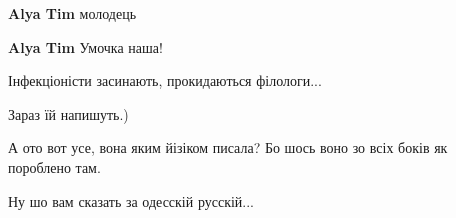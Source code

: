 \begin{itemize}
\begin{itemize}
 
\textbf{Alya Tim} молодець

 
\textbf{Alya Tim} Умочка наша!
\end{itemize}

 
Інфекціоністи засинають, прокидаються філологи...

 
Зараз їй напишуть.)

 
А ото вот усе, вона яким йізіком писала? Бо шось воно зо всіх боків як пороблено там.

 
Ну шо вам сказать за одесскій русскій...

 


\end{itemize}
